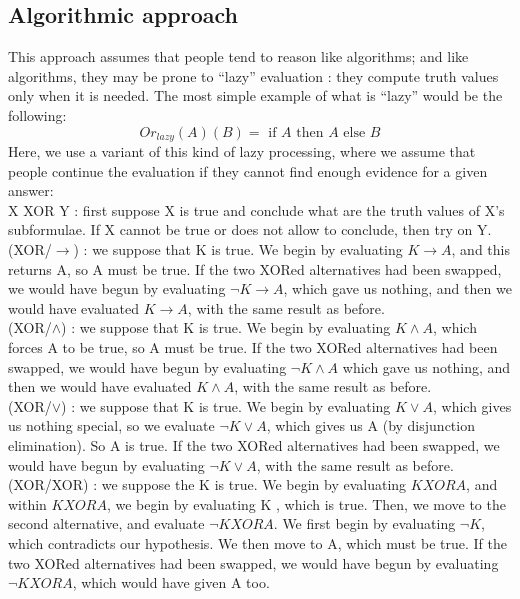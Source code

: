 \documentclass[french]{article}
\begin{document}
\subsection{Algorithmic approach}
This approach assumes that people tend to reason like algorithms; and like algorithms, they may be prone to ``lazy'' evaluation : they compute truth values only when it is needed. The most simple example of what is ``lazy'' would be the following:
\begin{equation}
	Or_{lazy}(A)(B) = \mbox{ if } A \mbox{ then } A \mbox{ else } B
\end{equation}
Here, we use a variant of this kind of lazy processing, where we assume that people continue the evaluation if they cannot find enough evidence for a given answer:\\
X XOR Y : first suppose X is true and conclude what are the truth values of X's subformulae. If X cannot be true or does not allow to conclude, then try on Y.\\
(XOR/$\rightarrow$) : we suppose that K is true. We begin by evaluating $K \rightarrow A$, and this returns A, so A must be true. If the two XORed alternatives had been swapped, we would have begun by evaluating $\neg K \rightarrow A$, which gave us nothing, and then we would have evaluated $K \rightarrow A$, with the same result as before.\\
(XOR/$\wedge$) : we suppose that K is true. We begin by evaluating $K \wedge A$, which forces A to be true, so A must be true. If the two XORed alternatives had been swapped, we would have begun by evaluating $\neg K \wedge A$ which gave us nothing, and then we would have evaluated $K \wedge A$, with the same result as before.\\
(XOR/$\vee$) : we suppose that K is true. We begin by evaluating $K \vee A$, which gives us nothing special, so we evaluate $\neg K \vee A$, which gives us A (by disjunction elimination). So A is true. If the two XORed alternatives had been swapped, we would have begun by evaluating $\neg K \vee A$, with the same result as before.
(XOR/XOR) : we suppose the K is true. We begin by evaluating $K XOR A$, and within $K XOR A$, we begin by evaluating K , which is true. Then, we move to the second alternative, and evaluate $ \neg K XOR A$. We first begin by evaluating $\neg K$, which contradicts our hypothesis. We then move to A, which must be true.  If the two XORed alternatives had been swapped, we would have begun by evaluating $\neg K XOR A$, which would have given A too.\\
\end{document}
